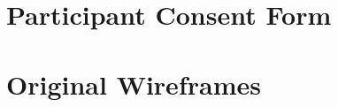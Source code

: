 \documentclass[12pt,a4paper,twoside,openright]{book}
\begin{document}
\chapter{Participant Consent Form}
\newpage
\label{appendix_participant_consent_form}
\chapter{Original Wireframes}
\newpage
\label{appendix_wireframes}
\end{document}
